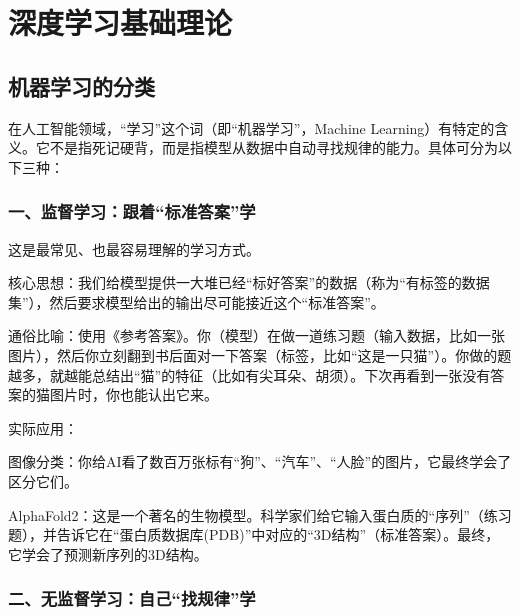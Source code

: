 \hypertarget{ux6df1ux5ea6ux5b66ux4e60ux57faux7840ux7406ux8bba}{%
\chapter{深度学习基础理论}\label{ux6df1ux5ea6ux5b66ux4e60ux57faux7840ux7406ux8bba}}

\hypertarget{ux673aux5668ux5b66ux4e60ux7684ux5206ux7c7b}{%
\section{机器学习的分类}\label{ux673aux5668ux5b66ux4e60ux7684ux5206ux7c7b}}

在人工智能领域，``学习''这个词（即``机器学习''，Machine Learning）有特定的含义。它不是指死记硬背，而是指模型从数据中自动寻找规律的能力。具体可分为以下三种：

\hypertarget{ux4e00ux76d1ux7763ux5b66ux4e60ux8ddfux7740ux6807ux51c6ux7b54ux6848ux5b66}{%
\subsection{一、监督学习：跟着``标准答案''学}\label{ux4e00ux76d1ux7763ux5b66ux4e60ux8ddfux7740ux6807ux51c6ux7b54ux6848ux5b66}}

这是最常见、也最容易理解的学习方式。

核心思想：我们给模型提供一大堆已经``标好答案''的数据（称为``有标签的数据集''），然后要求模型给出的输出尽可能接近这个``标准答案''。

通俗比喻：使用《参考答案》。你（模型）在做一道练习题（输入数据，比如一张图片），然后你立刻翻到书后面对一下答案（标签，比如``这是一只猫''）。你做的题越多，就越能总结出``猫''的特征（比如有尖耳朵、胡须）。下次再看到一张没有答案的猫图片时，你也能认出它来。

实际应用：

图像分类：你给AI看了数百万张标有``狗''、``汽车''、``人脸''的图片，它最终学会了区分它们。

AlphaFold2：这是一个著名的生物模型。科学家们给它输入蛋白质的``序列''（练习题），并告诉它在``蛋白质数据库(PDB)''中对应的``3D结构''（标准答案）。最终，它学会了预测新序列的3D结构。

\hypertarget{ux4e8cux65e0ux76d1ux7763ux5b66ux4e60ux81eaux5df1ux627eux89c4ux5f8bux5b66}{%
\subsection{二、无监督学习：自己``找规律''学}\label{ux4e8cux65e0ux76d1ux7763ux5b66ux4e60ux81eaux5df1ux627eux89c4ux5f8bux5b66}}

